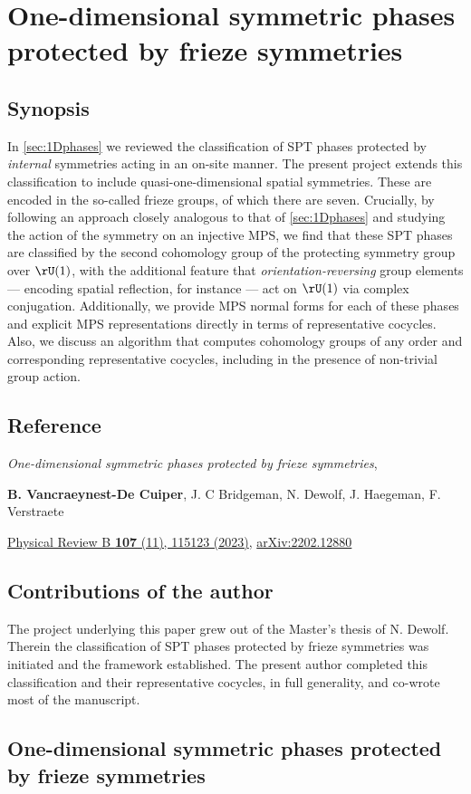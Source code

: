 \chapter{One-dimensional symmetric phases protected by frieze symmetries}

\section{Synopsis}
In \cref{sec:1Dphases} we reviewed the classification of SPT phases protected by \emph{internal} symmetries acting in an on-site manner. The present project extends this classification to include quasi-one-dimensional spatial symmetries. These are encoded in the so-called frieze groups, of which there are seven. Crucially, by following an approach closely analogous to that of \cref{sec:1Dphases} and studying the action of the symmetry on an injective MPS, we find that these SPT phases are classified by the second cohomology group of the protecting symmetry group over $\rU(1)$, with the additional feature that \emph{orientation-reversing} group elements --- encoding spatial reflection, for instance --- act on $\rU(1)$ via complex conjugation. Additionally, we provide MPS normal forms for each of these phases and explicit MPS representations directly in terms of representative cocycles. Also, we discuss an algorithm that computes cohomology groups of any order and corresponding representative cocycles, including in the presence of non-trivial group action.

\section{Reference}

\textit{One-dimensional symmetric phases protected by frieze symmetries}, \par\noindent
\textbf{B. Vancraeynest-De Cuiper}, J. C Bridgeman, N. Dewolf, J. Haegeman, F. Verstraete \par\noindent
\href{https://doi.org/10.1103/PhysRevB.107.115123}{Physical Review B \textbf{107} (11), 115123 (2023)}, \href{https://doi.org/10.48550/arXiv.2202.12880}{arXiv:2202.12880}
\section{Contributions of the author}
The project underlying this paper grew out of the Master's thesis of N. Dewolf. Therein the classification of SPT phases protected by frieze symmetries was initiated and the framework established. The present author completed this classification and their representative cocycles, in full generality, and co-wrote most of the manuscript.
\section{One-dimensional symmetric phases protected by frieze symmetries}

